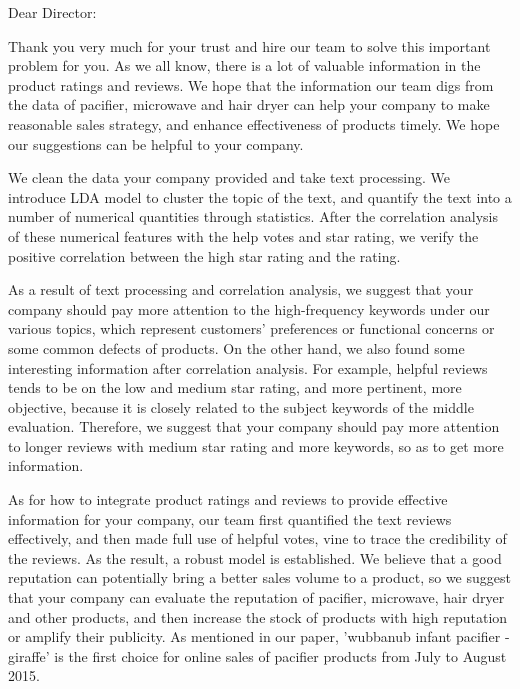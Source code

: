 \documentclass{mcmthesis}
\begin{document}
\newpage
\begin{memo}
\noindent Dear Director:

Thank you very much for your trust and hire our team to solve this important problem for you. As we all know, there is a lot of valuable information in the product ratings and reviews. We hope that the information our team digs from the data of pacifier, microwave and hair dryer can help your company to make reasonable sales strategy, and enhance effectiveness of products timely. We hope our suggestions can be helpful to your company. 

We clean the data your company provided and take text processing. We introduce LDA model to cluster the topic of the text, and quantify the text into a number of numerical quantities through statistics. After the correlation analysis of these numerical features with the help votes and star rating, we verify the positive correlation between the high star rating and the rating. 

As a result of text processing and correlation analysis, we suggest that your company should pay more attention to the high-frequency keywords under our various topics, which represent customers' preferences or functional concerns or some common defects of products. On the other hand, we also found some interesting information after correlation analysis. For example, helpful reviews tends to be on the low and medium star rating, and more pertinent, more objective, because it is closely related to the subject keywords of the middle evaluation. Therefore, we suggest that your company should pay more attention to longer reviews with medium star rating and more keywords, so as to get more information.

As for how to integrate product ratings and reviews to provide effective information for your company, our team first quantified the text reviews effectively, and then made full use of helpful votes, vine to trace the credibility of the reviews. As the result, a robust model is established. We believe that a good reputation can potentially bring a better sales volume to a product, so we suggest that your company can evaluate the reputation of pacifier, microwave, hair dryer and other products, and then increase the stock of products with high reputation or amplify their publicity. As mentioned in our paper, 'wubbanub infant pacifier - giraffe' is the first choice for online sales of pacifier products from July to August 2015.


\end{memo}
\end{document}
